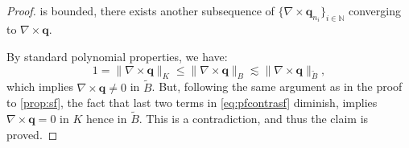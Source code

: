 \documentclass[10pt,a4paper]{amsart}
\begin{document}
\begin{proof}
  is bounded, there exists another subsequence of \(\{\nabla \times \boldsymbol{q}_{n_{i}}\}_{i\in \mathbb{N}}\) converging to \(\nabla \times \boldsymbol{q}\).

  By standard polynomial properties, we have:
  \begin{equation}
    1=\|\nabla \times \boldsymbol{q}\|_{K}\le\|\nabla \times \boldsymbol{q}\|_{B}\lesssim\|\nabla \times \boldsymbol{q}\|_{\tilde{B}},
  \end{equation}
  which implies \(\nabla \times \boldsymbol{q}\neq 0\) in \(\tilde{B}\). But, following the same argument as in the proof to \cref{prop:sf}, the fact that last two terms in \cref{eq:pfcontrasf} diminish, implies \(\nabla \times \boldsymbol{q} =  0\) in \(K\) hence in \(\tilde{B}\). This is a contradiction, and thus the claim is proved.
\end{proof}
\end{document}
